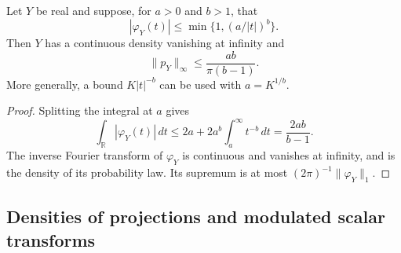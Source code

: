 \begin{lemma}\label{four:inversion}
Let \(Y\) be real and suppose, for \(a>0\) and \(b>1\), that
\[
 |\varphi_Y(t)|\leq\min\{1,(a/|t|)^b\}.
\]
Then \(Y\) has a continuous density vanishing at infinity and
\begin{equation}\label{four:inversion-bound}
 \|p_Y\|_\infty\leq\frac{ab}{\pi(b-1)}.
\end{equation}
More generally, a bound \(K|t|^{-b}\) can be used with \(a=K^{1/b}\).
\end{lemma}
\begin{proof}
Splitting the integral at \(a\) gives
\[
 \int_{\mathbb R}|\varphi_Y(t)|\,dt
 \leq2a+2a^b\int_a^\infty t^{-b}\,dt
 =\frac{2ab}{b-1}.
\]
The inverse Fourier transform of \(\varphi_Y\) is continuous and vanishes
at infinity, and is the density of its probability law.  Its supremum
is at most \((2\pi)^{-1}\|\varphi_Y\|_1\).
\end{proof}

\subsection{Densities of projections and modulated scalar transforms}

